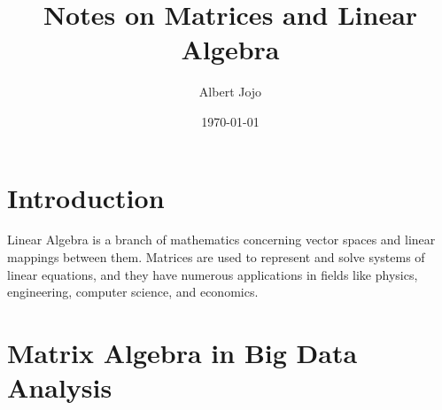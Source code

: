 \documentclass{article}
\title{Notes on Matrices and Linear Algebra}
\author{Albert Jojo}
\date{\today}
\begin{document}
\maketitle

\section{Introduction}

Linear Algebra is a branch of mathematics concerning vector spaces and linear mappings between them. Matrices are used to represent and solve systems of linear equations, and they have numerous applications in fields like physics, engineering, computer science, and economics.


\section{Matrix Algebra in Big Data Analysis}
\end{document}
